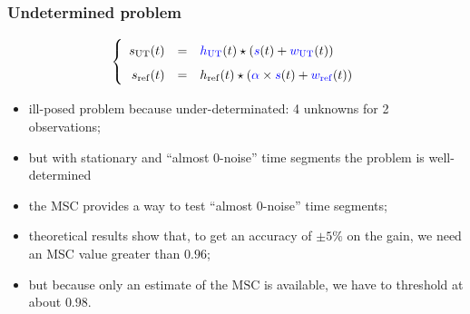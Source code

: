 \documentclass[handout,9pt]{beamer}
\def\MSC{\text{MSC}}
\def\sut{\mathrm{UT}}
\def\sref{\mathrm{ref}}
\begin{document}
\begin{frame}
\frametitle{Undetermined problem}
\begin{eqnarray*}
\left\{
\renewcommand\arraystretch{1.6}
\begin{array}{rcl}
s_{\sut}(t)&=&{\color{blue}h_{\sut}}(t)\star({\color{blue}s}(t)+{\color{blue}w_{\sut}}(t))
\\
s_{\sref}(t)&=&h_{\sref}(t)\star({\color{blue}\alpha}\times {\color{blue}s}(t)+{\color{blue}w_{\sref}}(t))
\end{array}\right.
\end{eqnarray*}
\begin{itemize}
\item
ill-posed problem because under-determinated: 4 unknowns for 2 observations;
\item
but with stationary and ``almost 0-noise'' time segments the problem is well-determined

\item
 the MSC provides a way to test ``almost 0-noise'' time segments;
\item
theoretical results show that, to get an accuracy of $\pm 5\%$ on the gain, we need an MSC value greater than $0.96$;
\item
but because only an estimate of the $\MSC$ is available, we have to threshold at about $0.98$. %
\end{itemize}
\end{frame}
\end{document}
